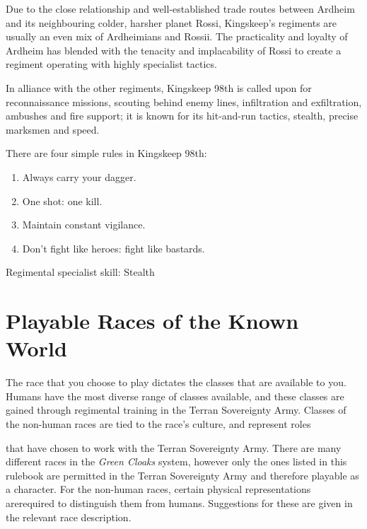 Due to the close relationship and well-established trade routes between Ardheim and its neighbouring colder, harsher planet Rossi, Kingskeep's regiments are usually an even mix of Ardheimians and Rossii. The practicality and loyalty of Ardheim has blended with the tenacity and implacability of Rossi to create a regiment operating with highly specialist tactics.

In alliance with the other regiments, Kingskeep 98th is called upon for reconnaissance missions, scouting behind enemy lines, infiltration and exfiltration, ambushes and fire support; it is known for its hit-and-run tactics, stealth, precise marksmen and speed.

There are four simple rules in Kingskeep 98th:

\begin{enumerate}[I]

\item Always carry your dagger.

\item One shot: one kill.

\item Maintain constant vigilance.

\item Don't fight like heroes: fight like bastards.

\end{enumerate}

Regimental specialist skill: Stealth

\chapter{Playable Races of the Known World}

The race that you choose to play dictates the classes that are available to you. Humans have the most diverse range of classes available, and these classes are gained through regimental training in the Terran Sovereignty Army. Classes of the non-human races are tied to the race's culture, and represent roles

that have chosen to work with the Terran Sovereignty Army. There are many different races in the \textit{Green Cloaks} system, however only the ones listed in this rulebook are permitted in the Terran Sovereignty Army and therefore playable as a character. For the non-human races, certain physical representations arerequired to distinguish them from humans. Suggestions for these are given in the relevant race description.

